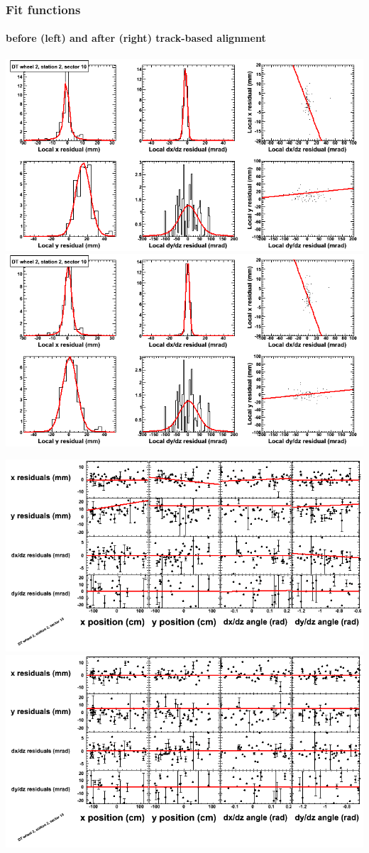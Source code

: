 \documentclass[compress]{beamer}
\begin{document}
\begin{frame}
\frametitle{Fit functions}
\framesubtitle{before (left) and after (right) track-based alignment}
\includegraphics[width=0.5\linewidth]{fitfunctions_re01/MBwhEst2sec10_bellcurves.png} \includegraphics[width=0.5\linewidth]{fitfunctions_re05/MBwhEst2sec10_bellcurves.png}

\includegraphics[width=0.5\linewidth]{fitfunctions_re01/MBwhEst2sec10_polynomials.png} \includegraphics[width=0.5\linewidth]{fitfunctions_re05/MBwhEst2sec10_polynomials.png}
\end{frame}
\end{document}
